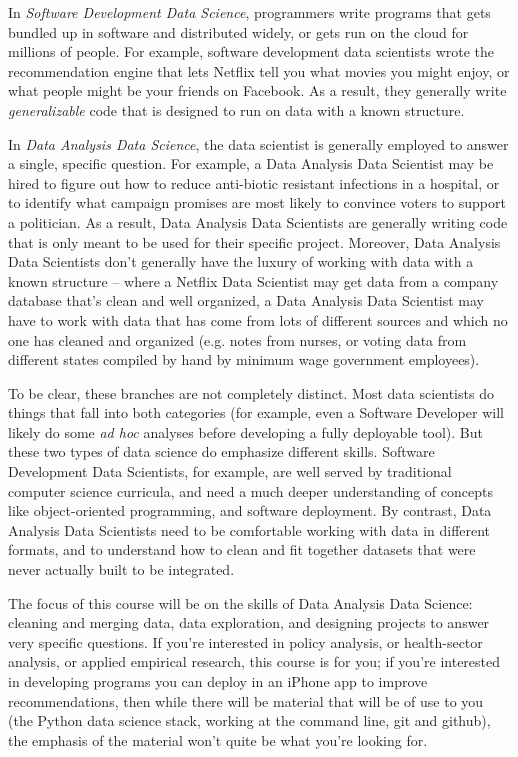 \documentclass[12pt]{article}
\begin{document}
In \emph{Software Development Data Science}, programmers write programs that gets bundled up in software and distributed widely, or gets run on the cloud for millions of people. For example, software development data scientists wrote the recommendation engine that lets Netflix tell you what movies you might enjoy, or what people might be your friends on Facebook. As a result, they generally write \emph{generalizable} code that is designed to run on data with a known structure.

In \emph{Data Analysis Data Science}, the data scientist is generally employed to answer a single, specific question. For example, a Data Analysis Data Scientist may be hired to figure out how to reduce anti-biotic resistant infections in a hospital, or to identify what campaign promises are most likely to convince voters to support a politician. As a result, Data Analysis Data Scientists are generally writing code that is only meant to be used for their specific project. Moreover, Data Analysis Data Scientists don't generally have the luxury of working with data with a known structure -- where a Netflix Data Scientist may get data from a company database that's clean and well organized, a Data Analysis Data Scientist may have to work with data that has come from lots of different sources and which no one has cleaned and organized (e.g. notes from nurses, or voting data from different states compiled by hand by minimum wage government employees).

To be clear, these branches are not completely distinct. Most data scientists do things that fall into both categories (for example, even a Software Developer will likely do some \emph{ad hoc} analyses before developing a fully deployable tool). But these two types of data science do emphasize different skills. Software Development Data Scientists, for example, are well served by traditional computer science curricula, and need a much deeper understanding of concepts like object-oriented programming, and software deployment. By contrast, Data Analysis Data Scientists need to be comfortable working with data in different formats, and to understand how to clean and fit together datasets that were never actually built to be integrated.

The focus of this course will be on the skills of Data Analysis Data Science: cleaning and merging data, data exploration, and designing projects to answer very specific questions. If you're interested in policy analysis, or health-sector analysis, or applied empirical research, this course is for you; if you're interested in developing programs you can deploy in an iPhone app to improve recommendations, then while there will be material that will be of use to you (the Python data science stack, working at the command line, git and github), the emphasis of the material won't quite be what you're looking for.
\end{document}
